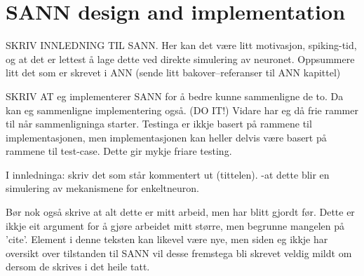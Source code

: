 

%






\section{SANN design and implementation}
\label{secSANN} 


	SKRIV INNLEDNING TIL SANN.
	Her kan det være litt motivasjon, spiking-tid, og at det er lettest å lage dette ved direkte simulering av neuronet.
	Oppsummere litt det som er skrevet i ANN (sende litt bakover--referanser til ANN kapittel)

	SKRIV AT eg implementerer SANN for å bedre kunne sammenligne de to. Da kan eg sammenligne implementering også. (DO IT!)
	Vidare har eg då frie rammer til når sammenligninga starter. Testinga er ikkje basert på rammene til implementasjonen, men implementasjonen kan heller delvis være basert på rammene til test-case. Dette gir mykje friare testing.

	I innledninga: skriv det som står kommentert ut (tittelen). -at dette blir en simulering av mekanismene for enkeltneuron.

	Bør nok også skrive at alt dette er mitt arbeid, men har blitt gjordt før.
	Dette er ikkje eit argument for å gjøre arbeidet mitt større, men begrunne mangelen på 'cite'.
	Element i denne teksten kan likevel være nye, men siden eg ikkje har oversikt over tilstanden til SANN vil desse fremstega bli skrevet veldig mildt om dersom de skrives i det heile tatt.


